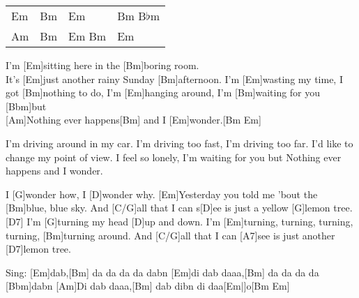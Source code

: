 

\hfill{}

\vspace{-0.3em}
\begin{guitar}
	{\footnotesize\begin{tabular}{|l|l|l|l|}
			Em & Bm & Em & Bm B$\flat$m \\
			Am & Bm & Em Bm & Em 
	\end{tabular}}

	I'm [Em]sitting here in the [Bm]boring room.
	\vspace{-2.875em} \\ \hfill {} \vspace{-0.125em}
	It's [Em]just another rainy Sunday [Bm]afternoon.
	I'm [Em]wasting my time, I got [Bm]nothing to do,
	I'm [Em]hanging around, I'm [Bm]waiting for you [Bbm]but
	\vspace{-2.875em} \\ \hfill {} \vspace{-0.125em}
	[Am]Nothing ever happens[Bm] and I [Em]wonder.[Bm Em]{}
	\vspace{-2.875em} \\ \hfill {} \vspace{-0.125em}

	I'm driving around in my car.
	I'm driving too fast, I'm driving too far.
	I'd like to change my point of view.
	I feel so lonely, I'm waiting for you but
	Nothing ever happens and I wonder.
	
	\begin{highlightbar}
		I [G]wonder how, I [D]wonder why. 
		[Em]Yesterday you told me 'bout the [Bm]blue, blue sky.
		And [C/G]all that I can s[D]ee is just a yellow [G]lemon tree.[D7]{}
		I'm [G]turning my head [D]up and down.
		I'm [Em]turning, turning, turning, turning, [Bm]turning around.
		And [C/G]all that I can [A7]see is just another [D7]lemon tree.
	\end{highlightbar}
	
	Sing: [Em]dab,[Bm] da da da da dabn [Em]di dab daaa,[Bm] da da da da [Bbm]dabn
	 [Am]Di dab daaa,[Bm] dab dibn di daa[Em|]o[Bm Em]{}
	

\end{guitar}
